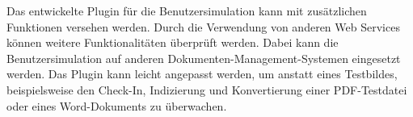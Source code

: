 Das entwickelte Plugin für die Benutzersimulation kann mit zusätzlichen Funktionen versehen werden.
Durch die Verwendung von anderen Web Services können weitere Funktionalitäten überprüft werden.
Dabei kann die Benutzersimulation auf anderen Dokumenten-Management-Systemen eingesetzt werden.
Das Plugin kann leicht angepasst werden, um anstatt eines Testbildes, beispielsweise den Check-In, Indizierung und Konvertierung einer \gls{PDF}-Testdatei oder eines Word-Dokuments zu überwachen.


%
%
%
%
